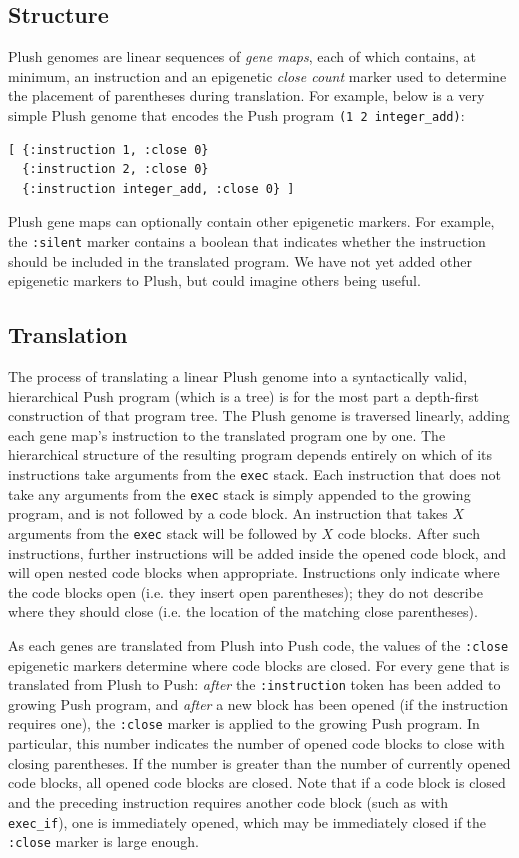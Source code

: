 \documentclass[graybox]{svmult}
\begin{document}
\subsection{Structure}
Plush genomes are linear sequences of \textit{gene maps}, each of which contains, at minimum, an instruction and an epigenetic \textit{close count} marker used to determine the placement of parentheses during translation.
For example, below is a very simple Plush genome that encodes the Push program \texttt{(1 2 integer\_add)}:
\begin{verbatim}
[ {:instruction 1, :close 0}
  {:instruction 2, :close 0}
  {:instruction integer_add, :close 0} ]
\end{verbatim}
Plush gene maps can optionally contain other epigenetic markers. For example, the \texttt{:silent} marker contains a boolean that indicates whether the instruction should be included in the translated program. We have not yet added other epigenetic markers to Plush, but could imagine others being useful.

\subsection{Translation}

The process of translating a linear Plush genome into a syntactically valid, hierarchical Push program (which is a tree) is for the most part a depth-first construction of that program tree. The Plush genome is traversed linearly, adding each gene map's instruction to the translated program one by one. The hierarchical structure of the resulting program depends entirely on which of its instructions take arguments from the \texttt{exec} stack. Each instruction that does not take any arguments from the \texttt{exec} stack is simply appended to the growing program, and is not followed by a code block. An instruction that takes $X$ arguments from the \texttt{exec} stack will be followed by $X$ code blocks. After such instructions, further instructions will be added inside the opened code block, and will open nested code blocks when appropriate. Instructions only indicate where the code blocks open (i.e. they insert open parentheses); they do not describe where they should close (i.e. the location of the matching close parentheses).

As each genes are translated from Plush into Push code, the values of the \texttt{:close} epigenetic markers determine where code blocks are closed. For every gene that is translated from Plush to Push: \textit{after} the \texttt{:instruction} token has been added to growing Push program, and \textit{after} a new block has been opened (if the instruction requires one), the \texttt{:close} marker is applied to the growing Push program. In particular, this number indicates the number of opened code blocks to close with closing parentheses. If the number is greater than the number of currently opened code blocks, all opened code blocks are closed. Note that if a code block is closed and the preceding instruction requires another code block (such as with \texttt{exec\_if}), one is immediately opened, which may be immediately closed if the \texttt{:close} marker is large enough.
\end{document}
